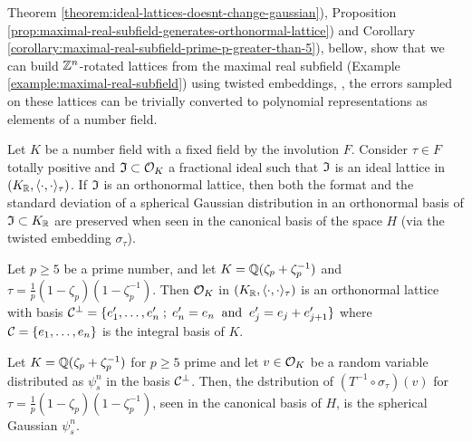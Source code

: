 \documentclass[a4paper,12pt]{article}
\begin{document}
\begin{text}
  Theorem \ref{theorem:ideal-lattices-doesnt-change-gaussian}), 
  Proposition \ref{prop:maximal-real-subfield-generates-orthonormal-lattice})
  and Corollary \ref{corollary:maximal-real-subfield-prime-p-greater-than-5}), bellow, show that we can build $\mathbb{Z}^n$-rotated
  lattices from the maximal real subfield
  (Example \ref{example:maximal-real-subfield}) using twisted embeddings, \ie, the
  errors sampled on these lattices can be trivially converted to polynomial
  representations as elements of a number field.
\end{text}

\begin{theorem}\label{theorem:ideal-lattices-doesnt-change-gaussian}
  Let $K$ be a number field with a fixed field by the involution $F$. Consider $\tau
  \in F$ totally positive and $\mathfrak{I} \subset \mathcal{O}_K$ a fractional ideal such that $\mathfrak{I}$ is an
  ideal lattice in $(K_{\mathbb{R}} , \langle \cdot,\cdot \rangle_\tau )$. If $\mathfrak{I}$ is an orthonormal lattice, then both the format and the standard deviation of a spherical Gaussian distribution in an orthonormal basis of $\mathfrak{I} \subset K_{\mathbb{R}}$ are preserved when seen in the canonical basis of the space $H$ (via the twisted embedding $\sigma_\tau$).
\end{theorem}

\begin{proposition}\label{prop:maximal-real-subfield-generates-orthonormal-lattice}
Let $p \geq 5$ be a prime number, and let $K = \mathbb{Q}(\zeta_{p} + \zeta_{p} ^{-1})$ and $\tau =
  \frac{1}{p}(1 - \zeta_p)( 1 - \zeta^{- 1}_p)$. Then $\mathcal{O}_K$ in $(K_{\mathbb{R}},\langle{\cdot,\cdot}\rangle_\tau)$ is an
  orthonormal lattice with basis $\mathcal{C}^\perp = \{e_1^\prime, \dots, e^\prime_n \;;\; e^\prime_n = e_n
  \;\; \text{and} \;\; e^\prime_j = e_j +  e^\prime_{j+ 1} \}$ where $\mathcal{C} = \{e_1,\dots,e_n\}$
  is the integral basis of $K$.
\end{proposition}

\begin{corollary}\label{corollary:maximal-real-subfield-prime-p-greater-than-5}
  Let $K = \mathbb{Q}(\zeta_{p} + \zeta_{p} ^{-1})$ for $p \geq 5$ prime and let $v \in \mathcal{O}_K$ be a random variable
  distributed as $\psi_s^n$ in the basis $\mathcal{C}^\perp$. Then, the dstribution of $(T^{-1}
  \circ \sigma_\tau)(v)$ for $\tau = \frac{1}{p}(1 - \zeta_p)( 1 - \zeta^{- 1}_p)$, seen in the
  canonical basis of $H$, is the spherical Gaussian $\psi_s^n$.
\end{corollary}
\end{document}
